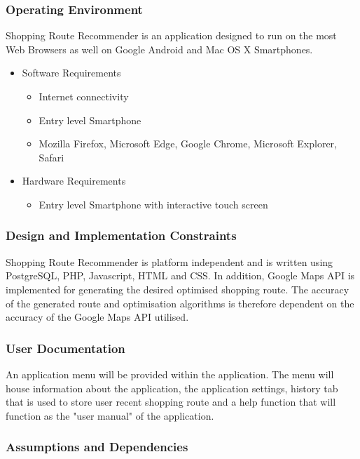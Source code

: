 \documentclass[10pt, a4paper, onecolumn]{scrartcl}
\begin{document}
		\subsubsection{Operating Environment}
		
			Shopping Route Recommender is an application designed to run on the most Web Browsers as well on Google Android and Mac OS X Smartphones. 
			
			\begin{itemize}
				\item Software Requirements
				\begin{itemize}
					\item Internet connectivity
					\item Entry level Smartphone
					\item Mozilla Firefox, Microsoft Edge, Google Chrome, Microsoft Explorer, Safari
				\end{itemize}
				\item Hardware Requirements
				\begin{itemize}
					\item Entry level Smartphone with interactive touch screen
				\end{itemize}
			\end{itemize}
		
		\subsubsection{Design and Implementation Constraints} 
		
			Shopping Route Recommender is platform independent and is written using PostgreSQL, PHP, Javascript, HTML and CSS. In addition, Google Maps API is implemented for generating the desired optimised shopping route. The accuracy of the generated route and optimisation algorithms is therefore dependent on the accuracy of the Google Maps API utilised. 
		
		\subsubsection{User Documentation}
		
		   	An application menu will be provided within the application. The menu will house information about the application, the application settings, history tab that is used to store user recent shopping route and a help function that will function as the "user manual" of the application. 
		
		\subsubsection{Assumptions and Dependencies}
		
\end{document}
